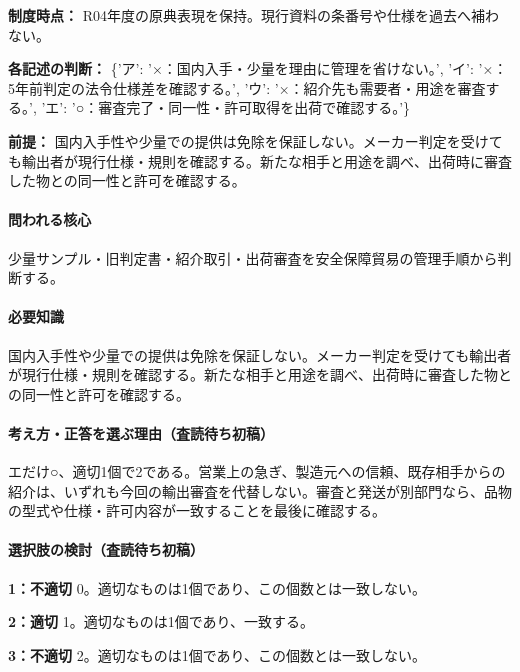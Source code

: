 \noindent\textbf{制度時点：} R04年度の原典表現を保持。現行資料の条番号や仕様を過去へ補わない。\par

\noindent\textbf{各記述の判断：} \{'ア': '×：国内入手・少量を理由に管理を省けない。', 'イ': '×：5年前判定の法令仕様差を確認する。', 'ウ': '×：紹介先も需要者・用途を審査する。', 'エ': '○：審査完了・同一性・許可取得を出荷で確認する。'\}\par

\noindent\textbf{前提：} 国内入手性や少量での提供は免除を保証しない。メーカー判定を受けても輸出者が現行仕様・規則を確認する。新たな相手と用途を調べ、出荷時に審査した物との同一性と許可を確認する。\par

\paragraph{問われる核心} 少量サンプル・旧判定書・紹介取引・出荷審査を安全保障貿易の管理手順から判断する。

\paragraph{必要知識} 国内入手性や少量での提供は免除を保証しない。メーカー判定を受けても輸出者が現行仕様・規則を確認する。新たな相手と用途を調べ、出荷時に審査した物との同一性と許可を確認する。

\paragraph{考え方・正答を選ぶ理由（査読待ち初稿）} エだけ○、適切1個で2である。営業上の急ぎ、製造元への信頼、既存相手からの紹介は、いずれも今回の輸出審査を代替しない。審査と発送が別部門なら、品物の型式や仕様・許可内容が一致することを最後に確認する。

\paragraph{選択肢の検討（査読待ち初稿）}\mbox{}\par

\noindent\textbf{1：不適切} 0。適切なものは1個であり、この個数とは一致しない。\par

\noindent\textbf{2：適切} 1。適切なものは1個であり、一致する。\par

\noindent\textbf{3：不適切} 2。適切なものは1個であり、この個数とは一致しない。\par


